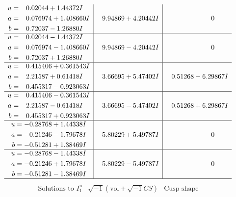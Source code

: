 \documentclass[1p]{elsarticle_modified}
\theoremstyle{definition}
\newcommand{\I}{\sqrt{-1}}
\begin{document}
$$\begin{array}{c|c|c}
\begin{aligned}
u &= \phantom{-}0.02044 + 1.44372 I \\
a &= \phantom{-}0.076974 + 1.408660 I \\
b &= \phantom{-}0.72037 - 1.26880 I\end{aligned}
 & \phantom{-}9.94869 + 4.20442 I & \phantom{-0.000000 } 0 \\ \hline\begin{aligned}
u &= \phantom{-}0.02044 - 1.44372 I \\
a &= \phantom{-}0.076974 - 1.408660 I \\
b &= \phantom{-}0.72037 + 1.26880 I\end{aligned}
 & \phantom{-}9.94869 - 4.20442 I & \phantom{-0.000000 } 0 \\ \hline\begin{aligned}
u &= \phantom{-}0.415406 + 0.361543 I \\
a &= \phantom{-}2.21587 + 0.61418 I \\
b &= \phantom{-}0.455317 - 0.923063 I\end{aligned}
 & \phantom{-}3.66695 + 5.47402 I & \phantom{-}0.51268 - 6.29867 I \\ \hline\begin{aligned}
u &= \phantom{-}0.415406 - 0.361543 I \\
a &= \phantom{-}2.21587 - 0.61418 I \\
b &= \phantom{-}0.455317 + 0.923063 I\end{aligned}
 & \phantom{-}3.66695 - 5.47402 I & \phantom{-}0.51268 + 6.29867 I \\ \hline\begin{aligned}
u &= -0.28768 + 1.44338 I \\
a &= -0.21246 - 1.79678 I \\
b &= -0.51281 + 1.38469 I\end{aligned}
 & \phantom{-}5.80229 + 5.49787 I & \phantom{-0.000000 } 0 \\ \hline\begin{aligned}
u &= -0.28768 - 1.44338 I \\
a &= -0.21246 + 1.79678 I \\
b &= -0.51281 - 1.38469 I\end{aligned}
 & \phantom{-}5.80229 - 5.49787 I & \phantom{-0.000000 } 0\\
 \hline 
 \end{array}$$\newpage$$\begin{array}{c|c|c}  
\text{Solutions to }I^u_{1}& \I (\text{vol} + \sqrt{-1}CS) & \text{Cusp shape}\\

\end{array}$$
\end{document}
